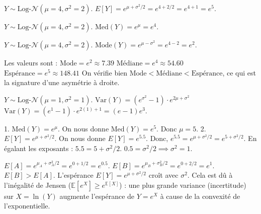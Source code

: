 \begin{correctionbox}
$Y \sim \text{Log-}\mathcal{N}(\mu=4, \sigma^2=2)$.
$E[Y] = e^{\mu + \sigma^2/2} = e^{4 + 2/2} = e^{4 + 1} = e^5$.
\end{correctionbox}

\begin{correctionbox}
$Y \sim \text{Log-}\mathcal{N}(\mu=4, \sigma^2=2)$.
$\text{Med}(Y) = e^{\mu} = e^4$.
\end{correctionbox}

\begin{correctionbox}
$Y \sim \text{Log-}\mathcal{N}(\mu=4, \sigma^2=2)$.
$\text{Mode}(Y) = e^{\mu - \sigma^2} = e^{4 - 2} = e^2$.
\end{correctionbox}

\begin{correctionbox}
Les valeurs sont :
$\text{Mode} = e^2 \approx 7.39$
$\text{Médiane} = e^4 \approx 54.60$
$\text{Espérance} = e^5 \approx 148.41$
On vérifie bien $\text{Mode} < \text{Médiane} < \text{Espérance}$, ce qui est la signature d'une asymétrie à droite.
\end{correctionbox}

\begin{correctionbox}
$Y \sim \text{Log-}\mathcal{N}(\mu=1, \sigma^2=1)$.
$\text{Var}(Y) = (e^{\sigma^2} - 1) \cdot e^{2\mu + \sigma^2}$
$\text{Var}(Y) = (e^{1} - 1) \cdot e^{2(1) + 1} = (e - 1)e^3$.
\end{correctionbox}

\begin{correctionbox}
1.  $\text{Med}(Y) = e^{\mu}$. On nous donne $\text{Med}(Y) = e^5$. Donc $\mu = 5$.
2.  $E[Y] = e^{\mu + \sigma^2/2}$. On nous donne $E[Y] = e^{5.5}$.
    Donc, $e^{5.5} = e^{\mu + \sigma^2/2} = e^{5 + \sigma^2/2}$.
    En égalant les exposants : $5.5 = 5 + \sigma^2/2$.
    $0.5 = \sigma^2/2 \implies \sigma^2 = 1$.
\end{correctionbox}

\begin{correctionbox}
$E[A] = e^{\mu_A + \sigma_A^2/2} = e^{0 + 1/2} = e^{0.5}$.
$E[B] = e^{\mu_B + \sigma_B^2/2} = e^{0 + 2/2} = e^{1}$.
$E[B] > E[A]$. L'espérance $E[Y] = e^{\mu + \sigma^2/2}$ croît avec $\sigma^2$. Cela est dû à l'inégalité de Jensen ($\mathbb{E}[e^X] \geq e^{\mathbb{E}[X]}$) : une plus grande variance (incertitude) sur $X=\ln(Y)$ augmente l'espérance de $Y=e^X$ à cause de la convexité de l'exponentielle.
\end{correctionbox}


